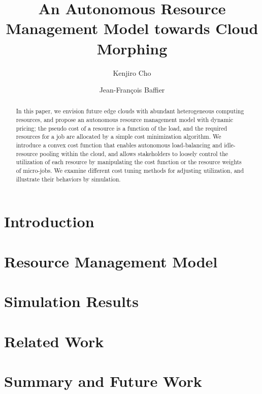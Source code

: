 \documentclass[10pt,sigconf,letterpaper,nonacm]{acmart}
\title{An Autonomous Resource Management Model towards Cloud Morphing}
\author{Kenjiro Cho}
\affiliation{\institution{IIJ Research Laboratory}\city{}\country{}}
\author{Jean-François Baffier}
\affiliation{\institution{IIJ Research Laboratory}\city{}\country{}}
\begin{document}
\begin{abstract}

    In this paper, we envision future edge clouds with
    abundant heterogeneous computing resources,
    and propose an autonomous resource management model with dynamic pricing;
    the pseudo cost of a resource is a function of the
    load, and the required resources for a job are allocated by a simple
    cost minimization algorithm.
    We introduce a convex cost function that enables autonomous
    load-balancing and idle-resource pooling within the cloud, and allows
    stakeholders to loosely control the utilization of each resource by
    manipulating the cost function or the resource weights of micro-jobs.
    We examine different cost tuning methods for adjusting
    utilization, and illustrate their behaviors by simulation.

\end{abstract}

\maketitle

\section{Introduction}



\section{Resource Management Model}



\section{Simulation Results}



\section{Related Work}



\section{Summary and Future Work}





\end{document}
